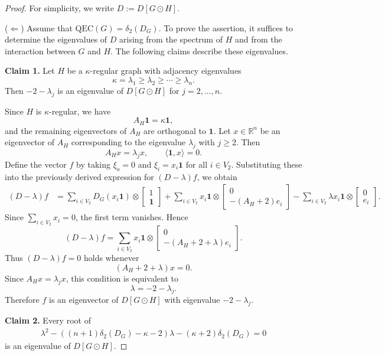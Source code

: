 \documentclass[10pt,a4paper]{amsart}
\begin{document}
\begin{proof}
For simplicity, we write $D:=D[G\odot H]$.

\medskip
\noindent
($\Leftarrow$)
Assume that $\mathrm{QEC}(G)=\delta_2(D_G)$.
To prove the assertion, it suffices to determine the eigenvalues of $D$
arising from the spectrum of $H$ and from the interaction between $G$
and $H$. The following claims describe these eigenvalues.

\medskip
\noindent
\textbf{Claim 1.}
Let $H$ be a $\kappa$-regular graph with adjacency eigenvalues
\[
\kappa=\lambda_1 \ge \lambda_2 \ge \cdots \ge \lambda_n .
\]
Then $-2-\lambda_j$ is an eigenvalue of $D[G\odot H]$ for $j=2,\dots,n$.

Since $H$ is $\kappa$-regular, we have
\[
A_H\mathbf{1}=\kappa\mathbf{1},
\]
and the remaining eigenvectors of $A_H$ are orthogonal to $\mathbf{1}$.
Let $x\in\mathbb{R}^n$ be an eigenvector of $A_H$ corresponding to the eigenvalue $\lambda_j$ with $j\ge2$. Then
\[
A_Hx=\lambda_j x,
\qquad
\langle \mathbf{1},x\rangle=0.
\]
Define the vector $f$ by taking $\xi_o=0$ and
$\xi_i=x_i\mathbf{1}$ for all $i\in V_2$. Substituting these into the previously derived expression for $(D-\lambda)f$, we obtain
\begin{align*}
(D-\lambda)f
&=
\sum_{i\in V_2}D_G(x_i\mathbf{1})\otimes
\begin{bmatrix}1\\\mathbf{1}\end{bmatrix}
+
\sum_{i\in V_2}x_i\mathbf{1}\otimes
\begin{bmatrix}0\\-(A_H+2)e_i\end{bmatrix}
-
\sum_{i\in V_2}\lambda x_i\mathbf{1}\otimes
\begin{bmatrix}0\\e_i\end{bmatrix}.
\end{align*}
Since $\sum_{i\in V_2}x_i=0$, the first term vanishes. Hence
\[
(D-\lambda)f
=
\sum_{i\in V_2}x_i\mathbf{1}\otimes
\begin{bmatrix}0\\-(A_H+2+\lambda)e_i\end{bmatrix}.
\]
Thus $(D-\lambda)f=0$ holds whenever
\[
(A_H+2+\lambda)x=0.
\]
Since $A_Hx=\lambda_jx$, this condition is equivalent to
\[
\lambda=-2-\lambda_j.
\]
Therefore $f$ is an eigenvector of $D[G\odot H]$ with eigenvalue $-2-\lambda_j$.

\medskip
\noindent
\textbf{Claim 2.}
Every root of
\begin{align}\label{eq root of lambda=psi}
\lambda^2-((n+1)\delta_2(D_G)-\kappa-2)\lambda-(\kappa+2)\delta_2(D_G)=0
\end{align}
is an eigenvalue of $D[G\odot H]$.


\end{proof}
\end{document}
